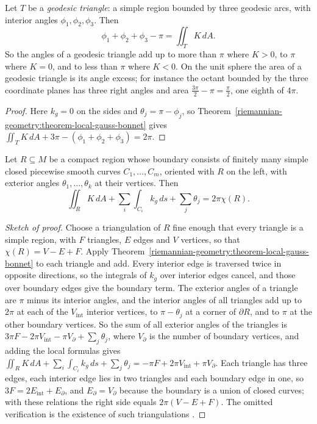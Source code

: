 \begin{corollary}\label{riemannian-geometry:corollary-geodesic-triangles}
Let $T$ be a \emph{geodesic triangle}: a simple region bounded by three geodesic arcs, with interior angles $\phi_1, \phi_2, \phi_3$. Then
\[
\phi_1 + \phi_2 + \phi_3 - \pi = \iint_TK\,dA.
\]
So the angles of a geodesic triangle add up to more than $\pi$ where $K > 0$, to $\pi$ where $K = 0$, and to less than $\pi$ where $K < 0$. On the unit sphere the area of a geodesic
triangle is its angle excess; for instance the octant bounded by the three coordinate planes has three right angles and area $\frac{3\pi}{2} - \pi = \frac{\pi}{2}$, one eighth of $4\pi$.
\end{corollary}

\begin{proof}
Here $k_g = 0$ on the sides and $\theta_j = \pi - \phi_j$, so Theorem~\ref{riemannian-geometry:theorem-local-gauss-bonnet} gives
$\iint_TK\,dA + 3\pi - (\phi_1 + \phi_2 + \phi_3) = 2\pi$.
\end{proof}

\begin{theorem}\label{riemannian-geometry:theorem-global-gauss-bonnet}
Let $R \subseteq M$ be a compact region whose boundary consists of finitely many simple closed piecewise smooth curves $C_1, \ldots, C_m$, oriented with $R$ on the left, with
exterior angles $\theta_1, \ldots, \theta_k$ at their vertices. Then
\[
\iint_RK\,dA + \sum_i\int_{C_i}k_g\,ds + \sum_j\theta_j = 2\pi\chi(R).
\]
\end{theorem}

\begin{proof}[Sketch of proof]
Choose a triangulation of $R$ fine enough that every triangle is a simple region, with $F$ triangles, $E$ edges and $V$ vertices, so that $\chi(R) = V - E + F$. Apply
Theorem~\ref{riemannian-geometry:theorem-local-gauss-bonnet} to each triangle and add. Every interior edge is traversed twice in opposite directions, so the integrals of $k_g$ over
interior edges cancel, and those over boundary edges give the boundary term. The exterior angles of a triangle are $\pi$ minus its interior angles, and the interior
angles of all triangles add up to $2\pi$ at each of the $V_{\mathrm{int}}$ interior vertices, to $\pi - \theta_j$ at a corner of $\partial R$, and to $\pi$ at the other boundary
vertices. So the sum of all exterior angles of the triangles is $3\pi F - 2\pi V_{\mathrm{int}} - \pi V_\partial + \sum_j\theta_j$, where $V_\partial$ is the number of boundary
vertices, and adding the local formulas gives
$\iint_RK\,dA + \sum_i\int_{C_i}k_g\,ds + \sum_j\theta_j = -\pi F + 2\pi V_{\mathrm{int}} + \pi V_\partial$. Each triangle has three edges, each interior edge lies in two triangles
and each boundary edge in one, so $3F = 2E_{\mathrm{int}} + E_\partial$, and $E_\partial = V_\partial$ because the boundary is a union of closed curves; with these relations the right
side equals $2\pi(V - E + F)$. The omitted verification is the existence of such triangulations \cite[Chapter 4]{do-carmo-curves-surfaces}.
\end{proof}

